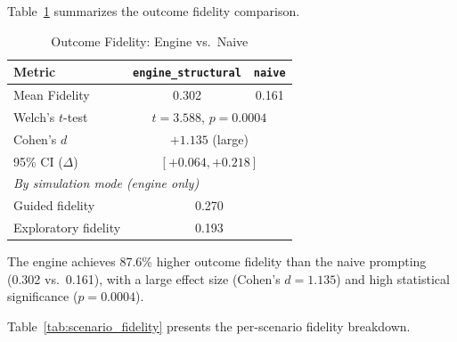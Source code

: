 \documentclass[12pt, a4paper]{report}
\newcommand{\engine}{\texttt{engine\_structural}}
\newcommand{\naive}{\texttt{naive}}
\begin{document}
Table~\ref{tab:fidelity} summarizes the outcome fidelity comparison.

\begin{table}[t]
\centering
\caption{Outcome Fidelity: Engine vs.\ Naive}
\label{tab:fidelity}
\begin{tabular}{lcc}
\toprule
Metric & \engine & \naive \\
\midrule
Mean Fidelity             & \cellcolor{better} 0.302 & 0.161 \\
Welch's $t$-test          & \multicolumn{2}{c}{$t = 3.588$, $p = 0.0004$} \\
Cohen's $d$               & \multicolumn{2}{c}{$+1.135$ (large)} \\
95\% CI ($\Delta$)        & \multicolumn{2}{c}{$[+0.064, +0.218]$} \\
\midrule
\multicolumn{3}{l}{\textit{By simulation mode (engine only)}} \\
Guided fidelity           & \multicolumn{2}{c}{0.270} \\
Exploratory fidelity      & \multicolumn{2}{c}{0.193} \\
\bottomrule
\end{tabular}
\end{table}

The engine achieves 87.6\% higher outcome fidelity than the naive prompting (0.302 vs.\ 0.161), with a large effect size (Cohen's $d = 1.135$) and high statistical significance ($p = 0.0004$).

Table~\ref{tab:scenario_fidelity} presents the per-scenario fidelity breakdown.
\end{document}
